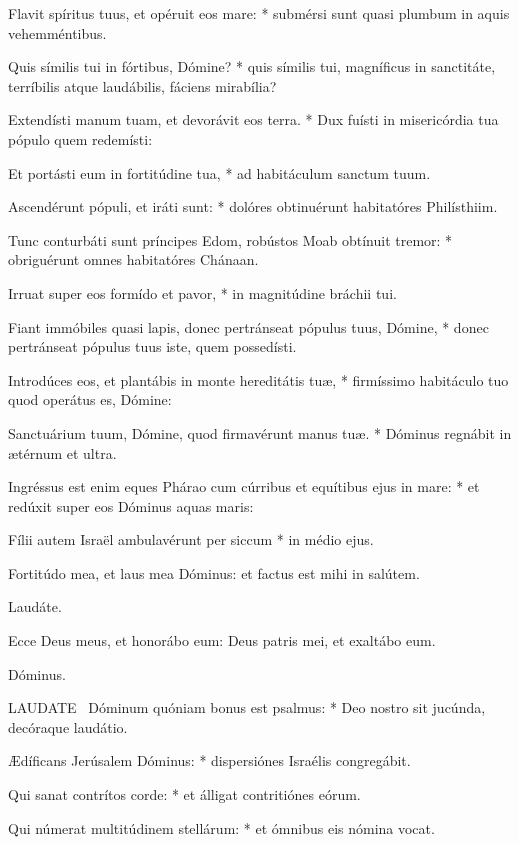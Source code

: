 Flavit spíritus tuus, et opéruit eos mare: * submérsi sunt quasi plumbum in aquis vehemméntibus.

Quis símilis tui in fórtibus, Dómine? * quis símilis tui, magníficus in sanctitáte, terríbilis atque laudábilis, fáciens mirabília?

Extendísti manum tuam, et devorávit eos terra. * Dux fuísti in misericórdia tua pópulo quem redemísti:

Et portásti eum in fortitúdine tua, * ad habitáculum sanctum tuum.

Ascendérunt pópuli, et iráti sunt: * dolóres obtinuérunt habitatóres Philísthiim.

Tunc conturbáti sunt príncipes Edom, robústos Moab obtínuit tremor: * obriguérunt omnes habitatóres Chánaan.

Irruat super eos formído et pavor, * in magnitúdine bráchii tui.

Fiant immóbiles quasi lapis, donec pertránseat pópulus tuus, Dómine, * donec pertránseat pópulus tuus iste, quem possedísti.

Introdúces eos, et plantábis in monte hereditátis tuæ, * firmíssimo habitáculo tuo quod operátus es, Dómine:

Sanctuárium tuum, Dómine, quod firmavérunt manus tuæ. * Dóminus regnábit in ætérnum et ultra.

Ingréssus est enim eques Phárao cum cúrribus et equítibus ejus in mare: * et redúxit super eos Dóminus aquas maris:

Fílii autem Israël ambulavérunt per siccum * in médio ejus.

 Fortitúdo mea, et laus mea Dóminus: et factus est mihi in salútem.

 Laudáte. \textdagger

  Ecce Deus meus, et honorábo eum: Deus patris mei, et exaltábo eum.

 Dóminus.


\lettrine[lines=2]{L}{AUDATE} \textdagger\ Dóminum quóniam bonus est psalmus: * Deo nostro sit jucúnda, decóraque laudátio.

Ædíficans Jerúsalem Dóminus: * dispersiónes Israélis congregábit.

Qui sanat contrítos corde: * et álligat contritiónes eórum.

Qui númerat multitúdinem stellárum: * et ómnibus eis nómina vocat.

